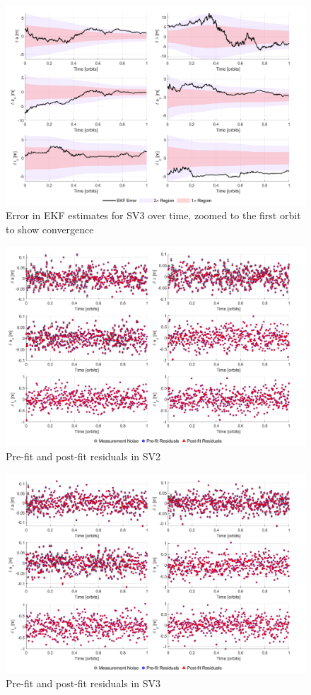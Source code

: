 \begin{figure}[H]
    \centering
    \includegraphics[width=0.7\linewidth]{sim/figures/PS8/EKF_error_SV3_zoomed.png}
    \caption{Error in EKF estimates for SV3 over time, zoomed to the first orbit to show convergence}
    \label{fig:sv3_ekf_error_zoomed}
\end{figure}


\begin{figure}[H]
    \centering
    \includegraphics[width=0.7\linewidth]{sim/figures/PS8/residuals_SV2.png}
    \caption{Pre-fit and post-fit residuals in SV2}
    \label{fig:sv2_residuals}
\end{figure}

\begin{figure}[H]
    \centering
    \includegraphics[width=0.7\linewidth]{sim/figures/PS8/residuals_SV3.png}
    \caption{Pre-fit and post-fit residuals in SV3}
    \label{fig:sv3_residuals}
\end{figure}
